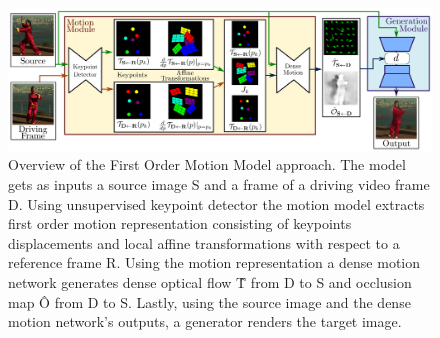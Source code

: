 \documentclass[english,12pt]{article}
\begin{document}
\begin{figure}[htb]
  \begin{centering}
      \includegraphics[scale=0.24]{images/method.PNG}
  \par\end{centering}
  \caption{\label{fig:second_figure}Overview of the First Order Motion Model approach. The model gets as inputs a source image S and a frame of a driving video frame D. Using unsupervised keypoint detector the motion model extracts first order motion
  representation consisting of keypoints displacements and local affine transformations with respect to a reference frame R. Using the motion representation a dense
  motion network generates dense optical flow \^T from D to S and occlusion map \^O from D to S. Lastly, using the source image and the dense motion network's outputs, a generator renders the target image.~\cite{DBLP:journals/corr/abs-2003-00196}}
\end{figure} 





\end{document}

